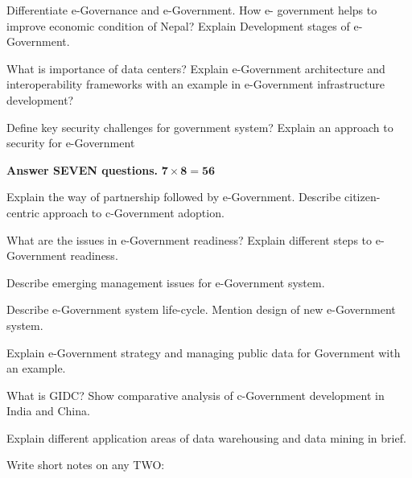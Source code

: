 \documentclass[a4paper, twoside, 12pt, noanswers]{exam}
\begin{document}
\begin{questions}

	\question[2+4+6] Differentiate e-Governance and e-Government. How e-
	government helps to improve economic condition of Nepal?
	Explain Development stages of e-Government.

	\question[3+9] What is importance of data centers? Explain e-Government
	architecture and interoperability frameworks with an example in
	e-Government infrastructure development?

	\question[6+6] Define key security challenges for government system? Explain an approach to security for e-Government

	

{\par}
{\hspace*{-0.5cm}\noindent\bfseries Answer SEVEN questions.} \hfill {\( \mathbf{7 \times 8 = 56}\)}

\question[2+6] Explain the way of partnership followed by e-Government. Describe citizen-centric approach to c-Government adoption.

\question[2+6] What are the issues in e-Government readiness? Explain different steps to e-Government readiness.

\question[8] Describe emerging management issues for e-Government system. 

\question[4+4]  Describe e-Government system life-cycle. Mention design of new
e-Government system.

\question[2+6] Explain e-Government strategy and managing public data for
Government with an example.

\question[2+6] What is GIDC? Show comparative analysis of c-Government
development in India and China.

\question[8] Explain different application areas of data warehousing and data
mining in brief.

\question[4+4] Write short notes on any TWO:
\end{questions}
\end{document}
